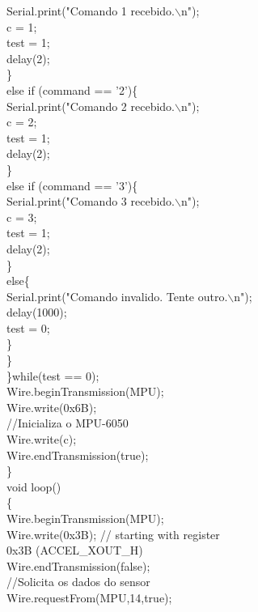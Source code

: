 \begin{anexosenv}
				Serial.print("Comando 1 recebido.$\backslash$n");\\    
				c = 1;\\
				test = 1;\\
				delay(2); \\
			\}\\
			else if (command == '2')\{\\
				Serial.print("Comando 2 recebido.$\backslash$n");\\    
				c = 2;\\
				test = 1;\\
				delay(2);\\
			\}\\
			else if (command == '3')\{\\
				Serial.print("Comando 3 recebido.$\backslash$n");\\   
				c = 3;\\
				test = 1;\\
				delay(2);\\
			\}\\
			else\{\\
				Serial.print("Comando invalido. Tente outro.$\backslash$n");\\ 
				delay(1000);\\
				test = 0;\\
			\}\\
		\}\\
	\}while(test == 0);\\
	Wire.beginTransmission(MPU);\\
	Wire.write(0x6B); \\
	
	//Inicializa o MPU-6050\\
	Wire.write(c); \\
	Wire.endTransmission(true);\\
\}\\
void loop()\\
\{ \\
	
	Wire.beginTransmission(MPU);\\
	Wire.write(0x3B);  // starting with register\\ 0x3B (ACCEL\_XOUT\_H)\\
	Wire.endTransmission(false);\\
	
	//Solicita os dados do sensor\\
	Wire.requestFrom(MPU,14,true); \\ 
	

\end{anexosenv}
